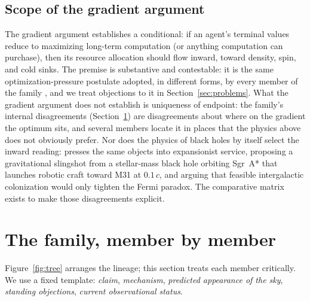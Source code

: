 \documentclass[11pt]{article}
\begin{document}
\subsection{Scope of the gradient argument}

The gradient argument establishes a conditional: if an agent's terminal values reduce to maximizing long-term computation (or anything computation can purchase), then its resource allocation should flow inward, toward density, spin, and cold sinks. The premise is substantive and contestable: it is the same optimization-pressure postulate adopted, in different forms, by every member of the family \citep{Smart2012,Sandberg2016,Vidal2014}, and we treat objections to it in Section~\ref{sec:problems}. What the gradient argument does not establish is uniqueness of endpoint: the family's internal disagreements (Section~\ref{sec:family}) are disagreements about where on the gradient the optimum sits, and several members locate it in places that the physics above does not obviously prefer. Nor does the physics of black holes by itself select the inward reading: \citet{Gould2022} presses the same objects into expansionist service, proposing a gravitational slingshot from a stellar-mass black hole orbiting Sgr~A* that launches robotic craft toward M31 at $0.1\,c$, and arguing that feasible intergalactic colonization would only tighten the Fermi paradox. The comparative matrix exists to make those disagreements explicit.

\section{The family, member by member}
\label{sec:family}

Figure~\ref{fig:tree} arranges the lineage; this section treats each member critically. We use a fixed template: \emph{claim}, \emph{mechanism}, \emph{predicted appearance of the sky}, \emph{standing objections}, \emph{current observational status}.
\end{document}
